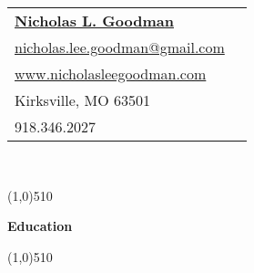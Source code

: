 \documentclass[letterpaper,11pt]{article}
\newcommand{\resheading}[1]{{\large {\begin{minipage}{\textwidth}{\textbf{#1 \vphantom{p\^{E}}}}\end{minipage}}}}
\begin{document}
\newcommand{\mywebheader}{
\begin{tabular*}{7in}{l@{\extracolsep{\fill}}r}
	\textbf{\href{http://www.nicholasleegoodman.com/}{\LARGE Nicholas L. Goodman}}\\
	\href{mailto:nicholas.lee.goodman@gmail.com}{nicholas.lee.goodman@gmail.com}\\
	\href{http://www.nicholasleegoodman.com}{www.nicholasleegoodman.com} \\ 	
	{Kirksville, MO 63501} \\
	{918.346.2027}
	\end{tabular*}
\\
\vspace{0.1in}}

\mywebheader


\line(1,0){510}

\resheading {Education}

\line(1,0){510}
\end{document}
